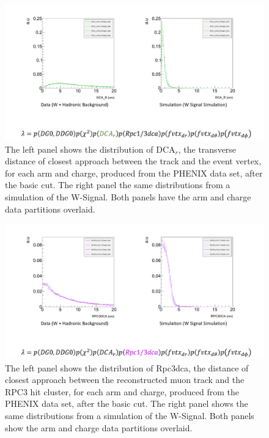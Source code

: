 \begin{figure}
  \centering
  \includegraphics[width=\linewidth,trim=4 70 4 4,clip]{./figures/pdf_dcar.png}
  \caption{
		The left panel shows the distribution of DCA$_r$, the transverse distance of
		closest approach between the track and the event vertex, for each arm and
		charge, produced from the PHENIX data set, after the basic cut. The right
		panel the same distributions from a simulation of the W-Signal. Both panels
		have the arm and charge data partitions overlaid.
  }
\end{figure}

\begin{figure}
  \centering
  \includegraphics[width=\linewidth,trim=4 70 4 4,clip]{./figures/pdf_rpc3dca.png}
  \caption{
		The left panel shows the distribution of Rpc3dca, the distance of closest
		approach between the reconstructed muon track and the RPC3 hit cluster, for
		each arm and charge, produced from the PHENIX data set, after the basic cut.
		The right panel shows the same distributions from a simulation of the
		W-Signal. Both panels show the arm and charge data partitions overlaid.
  }
  \label{fig:pdf_rpc3dca}
\end{figure}

